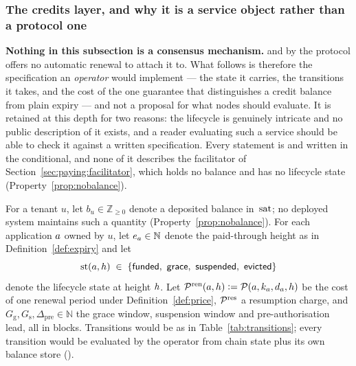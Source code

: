 
\subsubsection{The credits layer, and why it is a service object rather than a protocol one}
\label{sec:paying:creditspec}

\textbf{Nothing in this subsection is a consensus mechanism.}  and by 
the protocol offers no automatic renewal to attach it to. What follows is therefore the
specification an \emph{operator} would implement --- the state it carries, the transitions it takes,
and the cost of the one guarantee that distinguishes a credit balance from plain expiry --- and not
a proposal for what nodes should evaluate. It is retained at this depth for two reasons: the
lifecycle is genuinely intricate and no public description of it exists, and a reader evaluating such
a service should be able to check it against a written specification. Every statement is \planned and
written in the conditional, and none of it describes the facilitator of
Section~\ref{sec:paying:facilitator}, which holds no balance and has no lifecycle state
(Property~\ref{prop:nobalance}).

\begin{definition}
\label{def:creditstate}
For a tenant $u$, let $b_u \in \mathbb{Z}_{\ge 0}$ denote a deposited balance in $\,\mathrm{sat}$; no deployed
system maintains such a quantity (Property~\ref{prop:nobalance}). For each
application $a$ owned by $u$, let $e_{a} \in \mathbb{N}$ denote the paid-through height as in
Definition~\ref{def:expiry} and let
\[
\mathrm{st}(a, h) \;\in\; \{\textsf{funded},\ \textsf{grace},\ \textsf{suspended},\
\textsf{evicted}\}
\]
denote the lifecycle state at height $h$. Let $\mathcal{P}^{\mathrm{ren}}(a,h) \vcentcolon=
\mathcal{P}(a, k_{a}, d_{a}, h)$ be the cost of one renewal period under
Definition~\ref{def:price}, $\mathcal{P}^{\mathrm{res}}$ a resumption charge, and $G_{\mathrm{g}},
G_{\mathrm{s}}, \Delta_{\mathrm{pre}} \in \mathbb{N}$ the grace window, suspension window and
pre-authorisation lead, all in blocks. Transitions would be as in Table~\ref{tab:transitions}; every
transition would be evaluated by the operator from chain state plus its own balance store
(\Cref{rem:balance-location}).
\end{definition}

